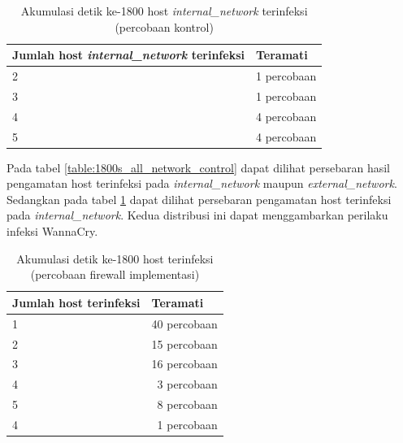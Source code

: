 \begin{table}[H]
	\caption{Akumulasi detik ke-1800 host \textit{internal\_network} terinfeksi (percobaan kontrol)}
	\label{table:1800s_internal_network_control}
	\begin{center}
		\begin{tabularx}{300px}{|X|r|}
			\hline
			\multicolumn{1}{|l}{\textbf{Jumlah host \textit{internal\_network} terinfeksi}} & \multicolumn{1}{|l|}{\textbf{Teramati}} \\ \hline
			2 & 1 percobaan\\ \hline
			3 & 1 percobaan\\ \hline
			4 & 4 percobaan\\ \hline
			5 & 4 percobaan\\ \hline
		\end{tabularx}
	\end{center}
\end{table}

Pada tabel \ref{table:1800s_all_network_control} dapat dilihat persebaran hasil pengamatan host terinfeksi pada \textit{internal\_network} maupun \textit{external\_network}. Sedangkan pada tabel \ref{table:1800s_internal_network_control} dapat dilihat persebaran pengamatan host terinfeksi pada \textit{internal\_network}. Kedua distribusi ini dapat menggambarkan perilaku infeksi WannaCry.

\begin{table}[H]
	\caption{Akumulasi detik ke-1800 host terinfeksi (percobaan firewall implementasi)}
	\label{table:1800s_all_network_firewalled}
	\begin{center}
		\begin{tabularx}{300px}{|X|r|}
			\hline
			\multicolumn{1}{|l}{\textbf{Jumlah host terinfeksi}} & \multicolumn{1}{|l|}{\textbf{Teramati}} \\ \hline
			1 & 40 percobaan\\ \hline
			2 & 15 percobaan\\ \hline
			3 & 16 percobaan\\ \hline
			4 & 3 percobaan\\ \hline
			5 & 8 percobaan\\ \hline
			4 & 1 percobaan\\ \hline
		\end{tabularx}
	\end{center}
\end{table}

